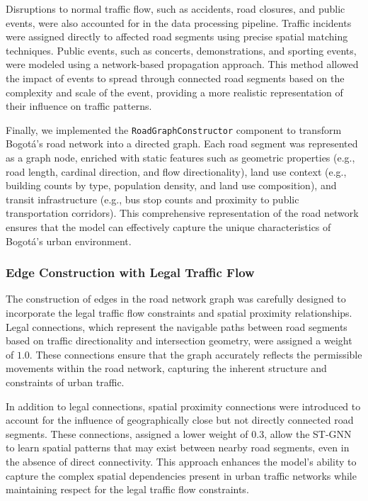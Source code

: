 \documentclass[11pt, a4paper]{article}
\begin{document}
Disruptions to normal traffic flow, such as accidents, road closures, and public events, were also accounted for in the data processing pipeline. Traffic incidents were assigned directly to affected road segments using precise spatial matching techniques. Public events, such as concerts, demonstrations, and sporting events, were modeled using a network-based propagation approach. This method allowed the impact of events to spread through connected road segments based on the complexity and scale of the event, providing a more realistic representation of their influence on traffic patterns.

Finally, we implemented the \texttt{RoadGraphConstructor} component to transform Bogotá's road network into a directed graph. Each road segment was represented as a graph node, enriched with static features such as geometric properties (e.g., road length, cardinal direction, and flow directionality), land use context (e.g., building counts by type, population density, and land use composition), and transit infrastructure (e.g., bus stop counts and proximity to public transportation corridors). This comprehensive representation of the road network ensures that the model can effectively capture the unique characteristics of Bogotá's urban environment.

\subsubsection{Edge Construction with Legal Traffic Flow}
The construction of edges in the road network graph was carefully designed to incorporate the legal traffic flow constraints and spatial proximity relationships. Legal connections, which represent the navigable paths between road segments based on traffic directionality and intersection geometry, were assigned a weight of $1.0$. These connections ensure that the graph accurately reflects the permissible movements within the road network, capturing the inherent structure and constraints of urban traffic.

In addition to legal connections, spatial proximity connections were introduced to account for the influence of geographically close but not directly connected road segments. These connections, assigned a lower weight of $0.3$, allow the ST-GNN to learn spatial patterns that may exist between nearby road segments, even in the absence of direct connectivity. This approach enhances the model's ability to capture the complex spatial dependencies present in urban traffic networks while maintaining respect for the legal traffic flow constraints.
\end{document}
